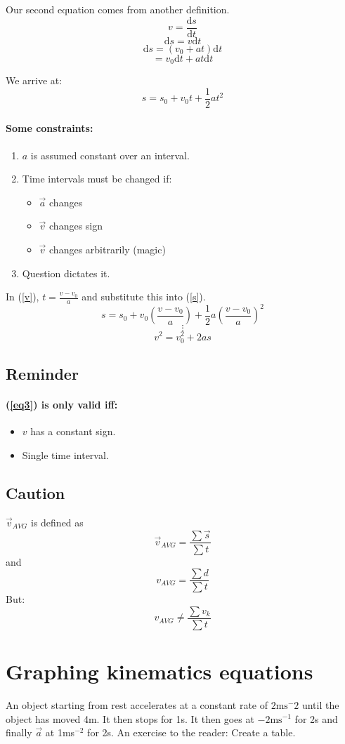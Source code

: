 \documentclass[letterpaper]{article}
\begin{document}
Our second equation comes from another definition.
\[
    v = \frac{\text{d}s}{\text{d}t}
\]
\[
    \text{d}s = v\text{d}t
\]
\[
    \text{d}s = (v_0 + at)\text{d}t
\]
\[
    = v_0\text{d}t + at\text{d}t
\]

We arrive at:
\begin{equation} \label{s}
    s = s_0 + v_0 t + \frac{1}{2}at^2
\end{equation}
\paragraph*{Some constraints:}
\begin{enumerate}
    \item $a$ is assumed constant over an interval.
    \item Time intervals must be changed if:
    \begin{itemize}
        \item $\vec{a}$ changes
        \item $\vec{v}$ changes sign
        \item $\vec{v}$ changes arbitrarily (magic)
    \end{itemize}
    \item Question dictates it.
\end{enumerate}
\newpage
In (\ref{v}), $t = \frac{v - v_0}{a}$ and substitute this into (\ref{s}).
\[
    s = s_0 + v_0 \left(\frac{v - v_0}{a}\right) + 
    \frac{1}{2} a \left( \frac{v - v_0}{a}\right) ^ 2
\]
\[
    \vdots
\]
\begin{equation} \label{eq3}
    v^2 = v_0^2 + 2as
\end{equation}
\subsection{Reminder}
\paragraph*{(\ref{eq3}) is only valid iff:}
    \begin{itemize}
        \item $v$ has a constant sign.
        \item Single time interval.
    \end{itemize}
\subsection{Caution}
$\vec{v}_{AVG}$ is defined as 
\[
\vec{v}_{AVG} = \frac{\sum{\vec{s}}}{\sum{t}}
\]
and
\[
    v_{AVG} = \frac{\sum{d}}{\sum{t}}
\]
But:
\[
    v_{AVG} \neq \frac{\sum{v_k}}{\sum{t}}
\]
\section{Graphing kinematics equations}
An object starting from rest accelerates at a constant rate of $2\text{ms}^-2$  until
the object has moved 4m. It then stops for 1s.
It then goes at $-2\text{ms}^{-1}$ for 2s and finally $\vec{a}$ at 1ms$^{-2}$
for 2s.
An exercise to the reader:
Create a table.
\end{document}
